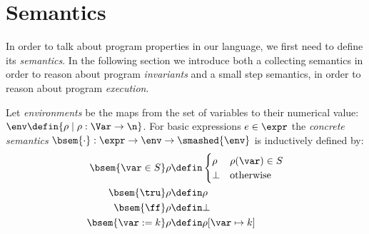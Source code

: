 \section{Semantics}

In order to talk about program properties in our language, we first
need to define its \emph{semantics}. In the following section we
introduce both a collecting semantics in order to reason about program
\emph{invariants} and a small step semantics, in order to reason about
program \emph{execution}.%

\begin{definition}
  Let \emph{environments} be the maps from the set of variables to
  their numerical value:
  \(\env \defin \{\rho \mid \rho : \Var \to \n\}\). For basic
  expressions \(e \in \expr\) the \emph{concrete semantics}
  \(\bsem{ \cdot} : \expr \to \env \to \smashed{\env}\) is
  inductively defined by:
  \begin{align*}
    \bsem{\var\in S} \rho & \defin \begin{cases} \rho & \rho(\var)\in S \\ \bot & \text{otherwise} \end{cases} \\
    \bsem{\tru} \rho & \defin \rho \\
    \bsem{\ff} \rho & \defin \bot \\
    \bsem{\var:= k} \rho & \defin \rho [\var\mapsto k] \\

\end{align*}
\end{definition}
